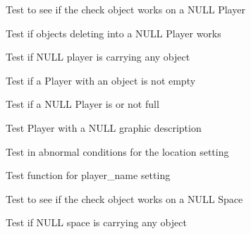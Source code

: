 \begin{DoxyRefList}
\item[\label{test__test000203}%
\hypertarget{test__test000203}{}%
Member \hyperlink{player__test_8h_a874f5bf56d0cca218979fee114a90d22}{test3\+\_\+player\+\_\+check\+\_\+object} ()]Test to see if the check object works on a N\+U\+LL Player  
\item[\label{test__test000193}%
\hypertarget{test__test000193}{}%
Member \hyperlink{player__test_8h_a452322fef33fc8706043c5067352eccd}{test3\+\_\+player\+\_\+del\+\_\+object} ()]Test if objects deleting into a N\+U\+LL Player works  
\item[\label{test__test000185}%
\hypertarget{test__test000185}{}%
Member \hyperlink{player__test_8h_a61bbeaff50cc839f226a53ed9b808784}{test3\+\_\+player\+\_\+get\+\_\+objects\+\_\+number} ()]Test if N\+U\+LL player is carrying any object  
\item[\label{test__test000196}%
\hypertarget{test__test000196}{}%
Member \hyperlink{player__test_8h_a08b329fb04b5d2a9023492e00bd19e48}{test3\+\_\+player\+\_\+is\+\_\+empty} ()]Test if a Player with an object is not empty  
\item[\label{test__test000199}%
\hypertarget{test__test000199}{}%
Member \hyperlink{player__test_8h_a8260b22f8889de8693acc075136697f3}{test3\+\_\+player\+\_\+is\+\_\+full} ()]Test if a N\+U\+LL Player is or not full  
\item[\label{test__test000171}%
\hypertarget{test__test000171}{}%
Member \hyperlink{player__test_8h_a7f865b46cfa086222fe0bfd1b9ed97f7}{test3\+\_\+player\+\_\+set\+\_\+graphic\+\_\+description} ()]Test Player with a N\+U\+LL graphic description  
\item[\label{test__test000174}%
\hypertarget{test__test000174}{}%
Member \hyperlink{player__test_8h_a317c0c84ef6ef843c15d5bab4a6b8a38}{test3\+\_\+player\+\_\+set\+\_\+location} ()]Test in abnormal conditions for the location setting  
\item[\label{test__test000168}%
\hypertarget{test__test000168}{}%
Member \hyperlink{player__test_8h_a447ebbb4ba2206abeaf4b60200e312da}{test3\+\_\+player\+\_\+set\+\_\+name} ()]Test function for player\+\_\+name setting  
\item[\label{test__test000256}%
\hypertarget{test__test000256}{}%
Member \hyperlink{space__test_8h_ab10ca9900e9610c2af3b7a5348f58b9d}{test3\+\_\+space\+\_\+check\+\_\+object} ()]Test to see if the check object works on a N\+U\+LL Space  
\item[\label{test__test000243}%
\hypertarget{test__test000243}{}%
Member \hyperlink{space__test_8h_ae690b65f5bd9c3a3bc7dbb1ecc746447}{test3\+\_\+space\+\_\+get\+\_\+objects\+\_\+number} ()]Test if N\+U\+LL space is carrying any object  

\end{DoxyRefList}
